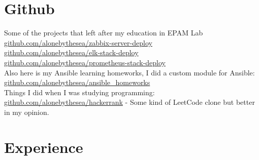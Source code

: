 \documentclass[11pt]{letter}
\newcommand{\forceindent}{\leavevmode{\parindent=1em\indent} %
}
\begin{document}
\section*{Github\vphantom{git}}


\forceindent Some of the projects that left after my education in EPAM Lab\vspace{0.2em}\\
\href{https://github.com/alonebythesea/zabbix-server-deploy}{github.com/alonebythesea/zabbix-server-deploy} \\
\href{https://github.com/alonebythesea/elk-stack-deploy}{github.com/alonebythesea/elk-stack-deploy} \\
\href{https://github.com/alonebythesea/prometheus-stack-deploy}{github.com/alonebythesea/prometheus-stack-deploy} \\
\forceindent Also here is my Ansible learning homeworks, I did a custom module for Ansible: \\
\href{https://github.com/alonebythesea/ansible_homeworks}{github.com/alonebythesea/ansible\_homeworks} \\
\forceindent Things I did when I was studying programming: \\
\href{https://github.com/alonebythesea/hackerrank}{github.com/alonebythesea/hackerrank} - Some kind of LeetCode clone but better in my opinion.\\

\section*{Experience\vphantom{exp}}
\end{document}
